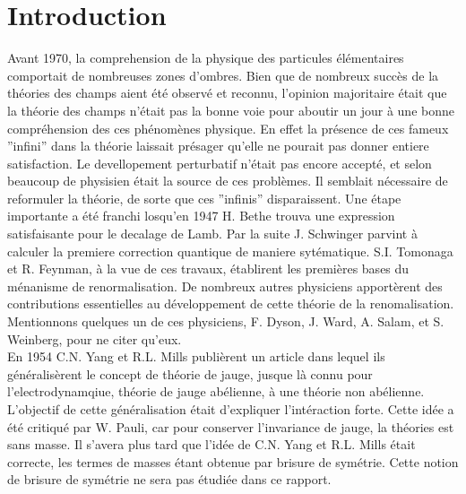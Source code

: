 \documentclass[a4paper,11pt]{article}
\theoremstyle{plain}
\theoremstyle{definition}
\theoremstyle{remark}
\numberwithin{equation}{section}
\numberwithin{equation}{subsection}
\numberwithin{figure}{section}
\begin{document}
\newpage


\tableofcontents 

\section{Introduction}

Avant 1970, la comprehension de la physique des particules élémentaires comportait de nombreuses zones d'ombres. Bien que de nombreux succès de la théories des champs aient été observé et reconnu, l'opinion majoritaire était que la théorie des champs n'était pas la bonne voie pour aboutir un jour à une bonne compréhension des ces phénomènes physique. En effet la présence de ces fameux ''infini'' dans la théorie laissait présager qu'elle ne pourait pas donner entiere satisfaction. Le devellopement perturbatif n'était pas encore accepté, et selon beaucoup de physisien était la source de ces problèmes. Il semblait nécessaire de reformuler la théorie, de sorte que ces ''infinis'' disparaissent. Une étape importante a été franchi losqu'en 1947 H. Bethe trouva une expression satisfaisante pour le decalage de Lamb. Par la suite J. Schwinger parvint à calculer la premiere correction quantique de maniere sytématique. S.I. Tomonaga et R. Feynman, à la vue de ces travaux, établirent les premières bases du ménanisme de renormalisation. De nombreux autres physiciens apportèrent des contributions essentielles au développement de cette théorie de la renomalisation. Mentionnons quelques un de ces physiciens, F. Dyson, J. Ward, A. Salam, et S. Weinberg, pour ne citer qu'eux. \\

En 1954 C.N. Yang et R.L. Mills publièrent un article dans lequel ils généralisèrent le concept de théorie de jauge, jusque là connu pour l'electrodynamqiue, théorie de jauge abélienne, à une théorie non abélienne. L'objectif de cette généralisation était d'expliquer l'intéraction forte. Cette idée a été critiqué par W. Pauli, car pour conserver l'invariance de jauge, la théories est sans masse. Il s'avera plus tard que l'idée de C.N. Yang et R.L. Mills était correcte, les termes de masses étant obtenue par brisure de symétrie. Cette notion de brisure de symétrie ne sera pas étudiée dans ce rapport.\\
\end{document}
